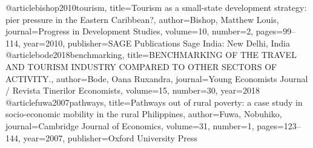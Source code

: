 @article{bishop2010tourism,
  title={Tourism as a small-state development strategy: pier pressure in the Eastern Caribbean?},
  author={Bishop, Matthew Louis},
  journal={Progress in Development Studies},
  volume={10},
  number={2},
  pages={99--114},
  year={2010},
  publisher={SAGE Publications Sage India: New Delhi, India}
}
@article{bode2018benchmarking,
  title={BENCHMARKING OF THE TRAVEL AND TOURISM INDUSTRY COMPARED TO OTHER SECTORS OF ACTIVITY.},
  author={Bode, Oana Ruxandra},
  journal={Young Economists Journal / Revista Tinerilor Economists},
  volume={15},
  number={30},
  year={2018}
}
@article{fuwa2007pathways,
  title={Pathways out of rural poverty: a case study in socio-economic mobility in the rural Philippines},
  author={Fuwa, Nobuhiko},
  journal={Cambridge Journal of Economics},
  volume={31},
  number={1},
  pages={123--144},
  year={2007},
  publisher={Oxford University Press}
}


